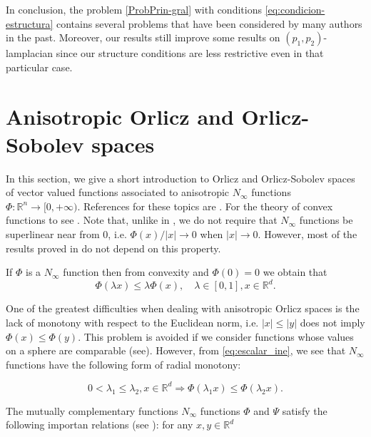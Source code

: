 \documentclass[twoside]{article}
\theoremstyle{remark}
\newcommand{\rr}{\mathbb{R}}
\renewcommand{\leq}{\leqslant}
\begin{document}
In conclusion, the problem \eqref{ProbPrin-gral} with conditions \eqref{eq:condicion-estructura}  contains several problems that have been considered by many authors in the past. 
Moreover, our results still improve some results on $(p_1,p_2)$-lamplacian since our structure conditions are less restrictive even in that particular case. 

\section{Anisotropic Orlicz and Orlicz-Sobolev spaces}\label{preliminares}

In this section, we give a short introduction to  Orlicz and Orlicz-Sobolev spaces of vector valued functions associated to anisotropic $N_{\infty}$ functions $\Phi:\rr^n\to[0,+\infty)$.  References for  these topics are \cite{Desch2001,Orliczvectorial2005,Skaff1969,cianchi2000fully,cianchi2004optimal,chamra2017anisotropic,trudinger1974imbedding,gwiazda2013anisotropic}. For the theory of convex functions to see \cite{clarke2013functional}. 
Note that, unlike in \cite{gwiazda2013anisotropic}, we do not require that $N_{\infty}$ functions be superlinear near from 0, i.e. $\Phi(x)/|x|\to 0$ when $|x|\to 0$. However, most of the results proved in \cite{gwiazda2013anisotropic} do not depend on this property.

If $\Phi$  is a $N_{\infty}$ function then from convexity and $\Phi(0)=0$ we obtain that
\begin{equation}\label{eq:escalar_ine}
 \Phi(\lambda x)\leq \lambda\Phi(x),\quad \lambda\in[0,1],x\in\rr^d.
\end{equation}

One of the greatest difficulties when dealing with anisotropic Orlicz spaces is the lack of  monotony  with respect to the Euclidean norm, i.e. $|x|\leq |y|$ does not imply $\Phi(x)\leq\Phi(y)$. This problem is avoided if we consider functions whose values on a sphere are comparable (see\cite{Skaff1969}). However, from \eqref{eq:escalar_ine}, we see that  $N_{\infty}$ functions have the following form of radial monotony: 

\begin{equation}\label{eq:escalar_ine_2} 0<\lambda_1\leq \lambda_2, x\in\rr^d \Rightarrow \Phi(\lambda_1 x)\leq\Phi(\lambda_2 x).\end{equation} 

The mutually complementary functions $N_{\infty}$ functions $\Phi$ and $\Psi$ satisfy the following importan relations (see \cite{clarke2013functional}): for any $x,y\in\rr^d$
\end{document}

